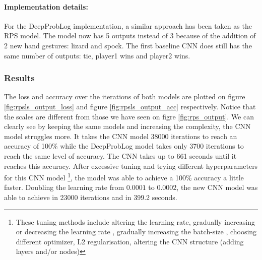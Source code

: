 \paragraph{Implementation details:} For the DeepProbLog implementation, a similar approach has been taken as the RPS model. The model now has 5 outputs instead of 3 because of the addition of 2 new hand gestures: lizard and spock. The first baseline CNN does still has the same number of outputs: tie, player1 wins and player2 wins. 

\subsubsection{Results}
The loss and accuracy over the iterations of both models are plotted on figure \ref{fig:rpsls_output_loss} and figure \ref{fig:rpsls_output_acc} respectively. Notice that the scales are different from those we have seen on figre \ref{fig:rps_output}. We can clearly see by keeping the same models and increasing the complexity, the CNN model struggles more. It takes the CNN model 38000 iterations to reach an accuracy of 100\% while the DeepProbLog model takes only 3700 iterations to reach the same level of accuracy. The CNN takes up to 661 seconds until it reaches this accuracy. After excessive tuning and trying different hyperparameters for this CNN model \footnote{These tuning methods include altering the learning rate, gradually increasing or decreasing the learning rate \cite{lr-decay}, gradually increasing the batch-size \cite{increase-batch}, choosing different optimizer, L2 regularisation, altering the CNN structure (adding layers and/or nodes)}, the model was able to achieve a 100\% accuracy a little faster.  Doubling the learning rate from $0.0001$ to $0.0002$, the new CNN model was able to achieve in 23000 iterations and in 399.2 seconds. 


